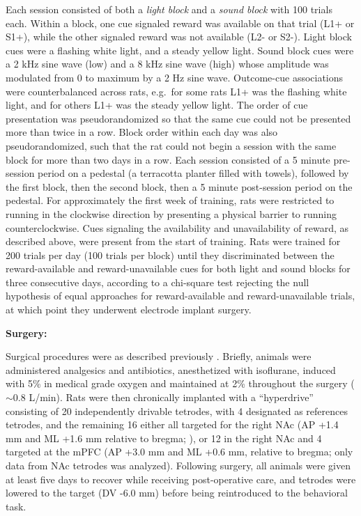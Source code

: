 \documentclass[11pt]{article}
\let\cite=\citep
\let\citeNP=\citealt
\begin{document}
Each session consisted of both a {\it light block} and a {\it sound block} with
100 trials each. Within a block, one cue signaled reward was available on that
trial (L1+ or S1+), while the other signaled reward was not available (L2- or
S2-). Light block cues were a flashing white light, and a steady yellow
light. Sound block cues were a 2 kHz sine wave (low) and a 8 kHz sine wave (high) whose
amplitude was modulated from 0 to maximum by a 2 Hz sine wave. Outcome-cue
associations were counterbalanced across rats, e.g.\ for some rats L1+ was the
flashing white light, and for others L1+ was the steady yellow light. The
order of cue presentation was pseudorandomized so that the same cue could not be
presented more than twice in a row. Block order within each day was also
pseudorandomized, such that the rat could not begin a session with the same
block for more than two days in a row. Each session consisted of a 5 minute
pre-session period on a pedestal (a terracotta planter filled with towels),
followed by the first block, then the second block, then a 5 minute post-session
period on the pedestal. For approximately the first week of training, rats were restricted to
running in the clockwise direction by presenting a physical barrier to
running counterclockwise. Cues signaling the availability and
unavailability of reward, as described above, were present from the
start of training. Rats were trained for 200 trials per day (100
trials per block) until they discriminated between the reward-available and reward-unavailable cues for both light and
sound blocks for three consecutive days, according to a chi-square test
rejecting the null hypothesis of equal approaches for reward-available and
reward-unavailable trials, at which point they underwent electrode implant
surgery.

{\bf Surgery:}

Surgical procedures were as described previously
\cite{Malhotra2015}. Briefly, animals were administered analgesics and
antibiotics, anesthetized with isoflurane, induced with 5\% in medical
grade oxygen and maintained at 2\% throughout the surgery ($\sim$0.8
L/min). Rats were then chronically implanted with a ``hyperdrive''
consisting of 20 independently drivable tetrodes, with 4 designated as references tetrodes, and the remaining 16
either all targeted for the right NAc (AP +1.4 mm and ML +1.6 mm relative to
bregma; \citeNP{atlas}), or 12 in the right NAc and 4 targeted at the
mPFC (AP +3.0 mm and ML +0.6 mm, relative to bregma; only data from
NAc tetrodes was analyzed). Following surgery, all animals were given
at least five days to recover while receiving post-operative care, and
tetrodes were lowered to the target (DV -6.0 mm) before being
reintroduced to the behavioral task.
\end{document}
